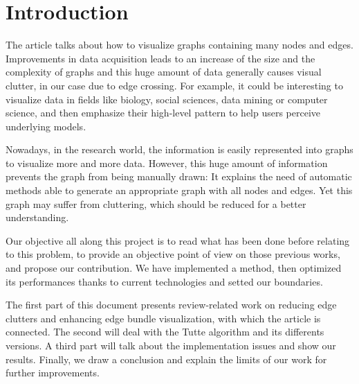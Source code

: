 \chapter*{Introduction}

The article talks about how to visualize graphs containing many nodes and edges. Improvements in data acquisition leads to an increase of the size and the complexity of graphs and this huge amount of data generally causes visual clutter, in our case due to edge crossing.
For example, it could be interesting to visualize data in fields like biology, social sciences, data mining or computer science, and then emphasize their high-level pattern to help users perceive underlying models.


Nowadays, in the research world, the information is easily represented into graphs to visualize more and more data. However, this huge amount of information prevents the graph from being manually drawn:  It explains the need of automatic methods able to generate an appropriate graph with all nodes and edges. Yet this graph may suffer from cluttering, which should be reduced for a better understanding.

Our objective all along this project is to read what has been done before relating to this problem, to provide an objective point of view on those previous works, and propose our contribution. We have implemented a method, then optimized its performances thanks to current technologies and setted our boundaries. 


The first part of this document presents review-related work on reducing edge clutters and enhancing edge bundle visualization, with which the article is connected. The second will deal with the Tutte algorithm and its differents versions. A third part will talk about the implementation issues and show our results. Finally, we draw a conclusion and explain the limits of our work for further improvements.
